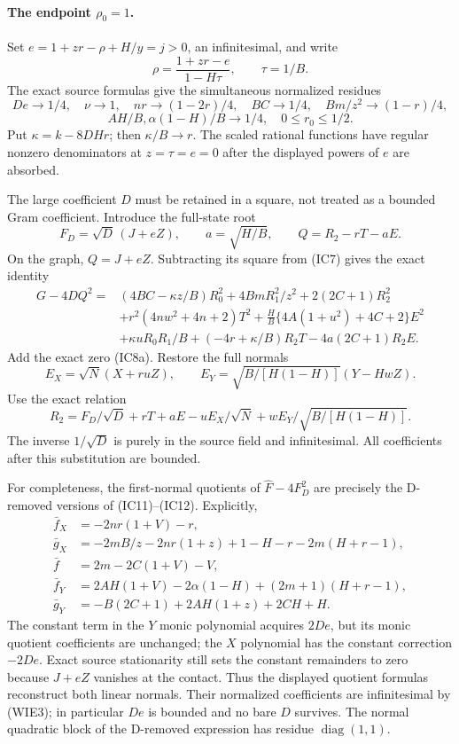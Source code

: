 \paragraph{The endpoint $\rho_0=1$.}
Set $e=1+zr-\rho+H/y=j>0$, an infinitesimal, and write
\[
 \rho=\frac{1+zr-e}{1-H\tau},\qquad \tau=1/B.
\]
The exact source formulas give the simultaneous normalized residues
\[
 De\to1/4,\quad\nu\to1,\quad nr\to(1-2r)/4,\quad
 BC\to1/4,\quad Bm/z^2\to(1-r)/4,
\]
\[
 AH/B,\alpha(1-H)/B\to1/4,\quad
 0\le r_0\le1/2.
\tag{WIE3}
\]
Put $\kappa=k-8DHr$; then $\kappa/B\to r$.
The scaled rational functions have regular nonzero denominators at
$z=\tau=e=0$ after the displayed powers of $e$ are absorbed.

The large coefficient $D$ must be retained in a square, not treated
as a bounded Gram coefficient. Introduce the full-state root
\[
 F_D=\sqrt D\,(J+eZ),\qquad a=\sqrt{H/B},\qquad
 Q=R_2-rT-aE.
\]
On the graph, $Q=J+eZ$. Subtracting its square from (IC7) gives the
exact identity
\begin{align*}
 G-4DQ^2={}&(4BC-\kappa z/B)R_0^2+4BmR_1^2/z^2
       +2(2C+1)R_2^2\\
 &+r^2(4nw^2+4n+2)T^2
 +\frac HB\{4A(1+u^2)+4C+2\}E^2\\
 &+\kappa uR_0R_1/B+(-4r+\kappa/B)R_2T
       -4a(2C+1)R_2E.
\tag{WIE4}
\end{align*}
Add the exact zero (IC8a). Restore the full normals
\[
 E_X=\sqrt N(X+ruZ),\qquad
 E_Y=\sqrt{B/[H(1-H)]}(Y-HwZ).
\]
Use the exact relation
\[
 R_2=F_D/\sqrt D+rT+aE-uE_X/\sqrt N
                         +wE_Y/\sqrt{B/[H(1-H)]}.
\tag{WIE5}
\]
The inverse $1/\sqrt D$ is purely in the source field and infinitesimal.
All coefficients after this substitution are bounded.

For completeness, the first-normal quotients of
$\widehat F-4F_D^2$ are precisely the D-removed versions of
(IC11)--(IC12). Explicitly,
\begin{align*}
 \bar f_X&=-2nr(1+V)-r,\\
 \bar g_X&=-2mB/z-2nr(1+z)+1-H-r-2m(H+r-1),\\
 \bar f&=2m-2C(1+V)-V,\\
 \bar f_Y&=2AH(1+V)-2\alpha(1-H)+(2m+1)(H+r-1),\\
 \bar g_Y&=-B(2C+1)+2AH(1+z)+2CH+H.
\end{align*}
The constant term in the $Y$ monic polynomial acquires $2De$, but
its monic quotient coefficients are unchanged; the $X$ polynomial
has the constant correction $-2De$. Exact source stationarity
still sets the constant remainders to zero because $J+eZ$ vanishes
at the contact. Thus the displayed quotient formulas reconstruct
both linear normals. Their normalized coefficients are infinitesimal
by (WIE3); in particular $De$ is bounded and no bare $D$ survives.
The normal quadratic block of the D-removed expression has residue
$\operatorname{diag}(1,1)$.


